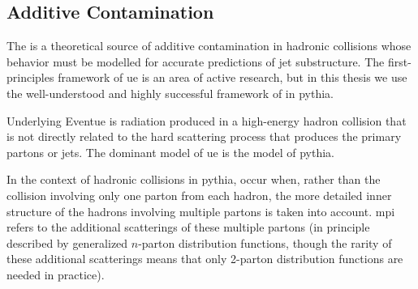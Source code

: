 \begin{subappendices}
\subsection{Additive Contamination}
\label{app:additive-contamination}


The  is a theoretical source of additive contamination in hadronic collisions whose behavior must be modelled for accurate predictions of jet substructure.
%
The first-principles framework of \gls{ue} is an area of active research, but in this thesis we use the well-understood and highly successful framework of \textit{} in \gls{pythia}.

\begin{definitionbox}{Underlying Event}{ue}
     is radiation produced in a high-energy hadron collision that is not directly related to the hard scattering process that produces the primary partons or jets.
    The dominant model of \gls{ue} is the  model of \gls{pythia}.

    In the context of hadronic collisions in \gls{pythia},  occur when, rather than the collision involving only one parton from each hadron, the more detailed inner structure of the hadrons involving multiple partons is taken into account.
    \gls{mpi} refers to the additional scatterings of these multiple partons (in principle described by generalized \(n\)-parton distribution functions, though the rarity of these additional scatterings means that only 2-parton distribution functions are needed in practice).
\end{definitionbox}

\begin{figure}[]
    \centering
    \caption{
    }
    \label{fig:additive-contamination-models}
\end{figure}





\end{subappendices}
